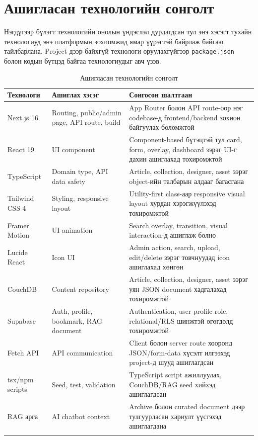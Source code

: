 \section{Ашигласан технологийн сонголт}
Нэгдүгээр бүлэгт технологийн онолын үндэслэл дурдагдсан тул энэ хэсэгт тухайн технологиуд энэ платформын зохиомжид ямар үүрэгтэй байрлаж байгааг тайлбарлана. Project дээр байхгүй технологи оруулахгүйгээр \texttt{package.json} болон кодын бүтцэд байгаа технологиудыг авч үзэв.

\begin{longtable}{|L{0.18\textwidth}|L{0.26\textwidth}|L{0.40\textwidth}|}
  \hline
  \textbf{Технологи} & \textbf{Ашиглах хэсэг} & \textbf{Сонгосон шалтгаан} \\ \hline
  Next.js 16 & Routing, public/admin page, API route, build & App Router болон API route-оор нэг codebase-д frontend/backend зохион байгуулах боломжтой \cite{nextjs_docs} \\ \hline
  React 19 & UI component & Component-based бүтэцтэй тул card, form, overlay, dashboard зэрэг UI-г дахин ашиглахад тохиромжтой \cite{react_learn} \\ \hline
  TypeScript & Domain type, API data safety & Article, collection, designer, asset зэрэг object-ийн талбарын алдааг багасгана \cite{typescript_docs} \\ \hline
  Tailwind CSS 4 & Styling, responsive layout & Utility-first class-аар responsive visual layout хурдан хэрэгжүүлэхэд тохиромжтой \cite{tailwind_docs} \\ \hline
  Framer Motion & UI animation & Search overlay, transition, visual interaction-д ашиглаж болно \cite{framer_motion_docs} \\ \hline
  Lucide React & Icon UI & Admin action, search, upload, edit/delete зэрэг товчнуудад icon ашиглахад хөнгөн \\ \hline
  CouchDB & Content repository & Article, collection, designer, asset зэрэг уян JSON document хадгалахад тохиромжтой \cite{couchdb_docs} \\ \hline
  Supabase & Auth, profile, bookmark, RAG document & Authentication, user profile role, relational/RLS шинжтэй өгөгдөлд тохиромжтой \cite{supabase_docs,supabase_auth_docs} \\ \hline
  Fetch API & API communication & Client болон server route хооронд JSON/form-data хүсэлт илгээхэд project-д шууд ашиглагдсан \\ \hline
  tsx/npm scripts & Seed, test, validation & TypeScript script ажиллуулах, CouchDB/RAG seed хийхэд ашиглагдсан \\ \hline
  RAG арга & AI chatbot context & Archive болон curated document дээр тулгуурласан хариулт үүсгэхэд ашиглагдана \cite{rag_lewis_2020} \\ \hline
  \caption{Ашигласан технологийн сонголт}
  \label{tab:ch3-technology-choice}\\
\end{longtable}

